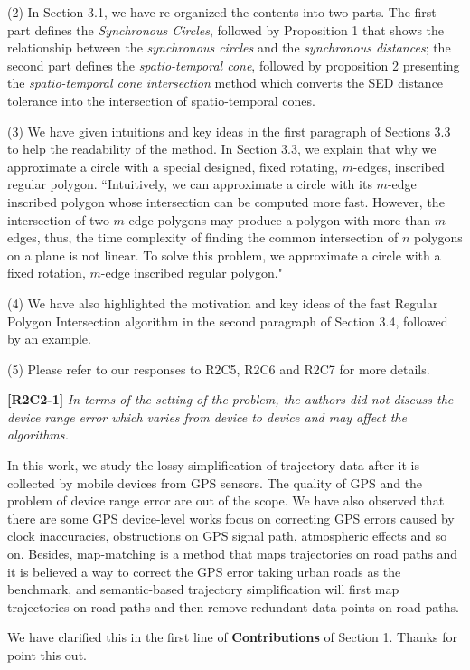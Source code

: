 \documentclass{letter}
\begin{document}
(2) In Section 3.1, we have re-organized the contents into two parts. The first part defines the \emph{Synchronous Circles}, followed by Proposition 1 that shows the relationship between the \textit{synchronous circles} and the \textit{synchronous distances}; the second part defines the \textit{spatio-temporal cone}, followed by proposition 2 presenting the \textit{spatio-temporal cone intersection} method which converts the SED distance tolerance into the intersection of spatio-temporal cones.

(3) We have given intuitions and key ideas in the first paragraph of Sections 3.3 to help the readability of the method. In Section 3.3, we explain that why we approximate a circle with a special designed, fixed rotating, $m$-edges, inscribed regular polygon. ``Intuitively, we can approximate a circle with its $m$-edge inscribed polygon {whose intersection can be computed more fast}. However, the intersection of two $m$-edge polygons may produce a polygon with more than $m$ edges, thus, the time complexity of finding the common intersection of $n$ polygons on a plane is not linear. To solve this problem, we approximate a circle with a fixed rotation, $m$-edge inscribed regular polygon."

(4) We have also highlighted the motivation and key ideas of the fast Regular Polygon Intersection algorithm in the second paragraph of Section 3.4, followed by an example.

(5) Please refer to our responses to R2C5, R2C6 and R2C7 for more details.

\textbf{[R2C2-1]} \emph{In terms of the setting of the problem, the authors did not discuss the device range error which varies from device to device and may affect the algorithms.}

In this work, we study the lossy simplification of trajectory data after it is collected by mobile devices from GPS sensors. The quality of GPS and the problem of device range error are out of the scope. 
%
We have also observed that there are some GPS device-level works focus on correcting GPS errors caused by clock inaccuracies, obstructions on GPS signal path, atmospheric effects and so on. Besides, map-matching is a method that maps trajectories on road paths and it is believed a way to correct the GPS error taking urban roads as the benchmark, and semantic-based trajectory simplification will first map trajectories on road paths and then remove redundant data points on road paths.

We have clarified this in the first line of \textbf{Contributions} of Section 1. Thanks for point this out.
\end{document}
